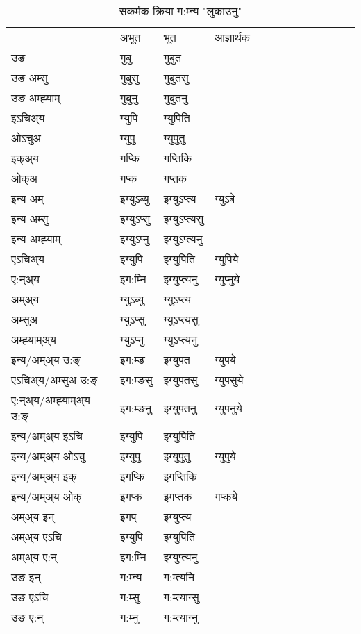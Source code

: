 \begin{table}[H]
\centering
\caption{\label{up.vt} सकर्मक क्रिया  ग:म्‍न्य  "लुकाउनु"  }
\begin{tabular}{l|l|l|l|l|l|l|l|l|l|l|l|l}  \toprule
&अभूत & भूत & आज्ञार्थक \\ 
उङ &गुबु &गुबुत \\ 
उङ अम्सु &गुबुसु &गुबुतसु \\ 
उङ अम्ह्‍याम् &गुबुनु &गुबुतनु \\ 
इऽचिअ्य &ग्युपि &ग्युपिति   \\ 
ओऽचुअ &ग्युपु &ग्युपुतु   \\ 
इक्अ्य &गप्कि &गप्‍तिकि   \\ 
ओक्अ &गप्क &गप्‍तक   \\ 
इन्य अम् & इग्युऽब्यु  & इग्युऽप्‍त्य &ग्युऽबे  \\ 
इन्य अम्सु & इग्युऽप्सु  & इग्युऽप्‍त्यसु   \\ 
इन्य अम्ह्‍याम् & इग्युऽप्‍नु  & इग्युऽप्‍त्यनु   \\ 
एऽचिअ्य & इग्युपि & इग्युपिति &ग्युपिये    \\ 
ए:न्अ्य & इग:म्‍नि  & इग्युप्‍त्यनु &ग्युप्‍नुये  \\ 
अम्अ्य & ग्युऽब्यु  & ग्युऽप्‍त्य  \\ 
अम्सुअ & ग्युऽप्सु & ग्युऽप्‍त्यसु  \\ 
अम्ह्‍याम्अ्य & ग्युऽप्‍नु  & ग्युऽप्‍त्यनु \\ 
\midrule
इन्य/अम्अ्य उ:ङ्‌&इग:म्ङ & इग्युपत &ग्युपये \\ 
एऽचिअ्य/अम्सुअ उ:ङ्‌ &इग:म्ङसु & इग्युपतसु &ग्युपसुये \\ 
ए:न्अ्य/अम्ह्‍याम्अ्य उ:ङ्‌ &इग:म्ङनु & इग्युपतनु &ग्युपनुये \\ 
इन्य/अम्अ्य इऽचि & इग्युपि & इग्युपिति    \\ 
इन्य/अम्अ्य ओऽचु & इग्युपु & इग्युपुतु  &ग्युपुये  \\ 
इन्य/अम्अ्य इक् & इगप्कि & इगप्‍तिकि   \\ 
इन्य/अम्अ्य ओक् & इगप्क & इगप्‍तक  &गप्कये  \\ 
अम्अ्य इन् & इगप् & इग्युप्‍त्य   \\ 
अम्अ्य एऽचि & इग्युपि & इग्युपिति    \\ 
अम्अ्य ए:न् & इग:म्‍नि  & इग्युप्‍त्यनु  \\ 
\midrule
उङ इन् & ग:म्‍न्य  & ग:म्त्यनि  \\ 
उङ एऽचि & ग:म्सु  & ग:म्त्यान्सु   \\ 
उङ ए:न्& ग:म्‍नु  & ग:म्त्यान्‍नु   \\ 
\bottomrule
\end{tabular}
\end{table}


